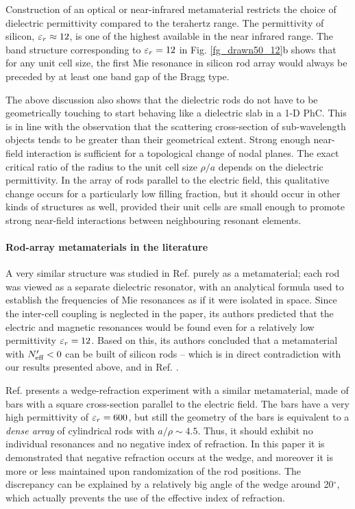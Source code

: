Construction of an optical or near-infrared metamaterial restricts the choice of dielectric permittivity compared to the terahertz range. 
The permittivity of silicon, $\varepsilon_r \approx 12$, is one of the highest available in the near infrared range. The band structure corresponding to $\varepsilon_r=12$ in Fig. \ref{fg_drawn50_12}b shows that for any unit cell size, the first Mie resonance in silicon rod array would always be preceded by at least one band gap of the Bragg type. 

The above discussion also shows that the dielectric rods do not have to be geometrically touching to start behaving like a dielectric slab in a 1-D PhC. This is in line with the observation that the scattering cross-section of sub-wavelength objects tends to be greater than their geometrical extent.
Strong enough near-field interaction is sufficient for a topological change of nodal planes. The exact critical ratio of the radius to the unit cell size $\rho/a$ depends on the dielectric permittivity. In the array of rods parallel to the electric field, this qualitative change occurs for a particularly low filling fraction, but it should occur in other kinds of structures as well, provided their unit cells are small enough to promote strong near-field interactions between neighbouring resonant elements.

\paragraph{Rod-array metamaterials in the literature} %
A very similar structure was studied in Ref. \cite{vynck2009all} purely as a metamaterial; each rod was viewed as a separate dielectric resonator, with an analytical formula used to establish the frequencies of  Mie resonances as if it were isolated in space. Since the inter-cell coupling is neglected in the paper, its authors predicted that the electric and magnetic resonances would be found even for a relatively low permittivity $\varepsilon_r = 12$. Based on this, its authors concluded that a metamaterial with $N_{\text{eff} }'<0$ can be built of silicon rods -- which is in direct contradiction with our results presented above, and in Ref. \cite{dominec2014transition}.

Ref. \cite{peng2007} presents a wedge-refraction experiment with a similar metamaterial, made of bars with a square cross-section parallel to the electric field. The bars have a very high permittivity of $\varepsilon_r=600$, but still the geometry of the bars is equivalent to a \textit{dense array} of cylindrical rods with $a/\rho \sim 4.5$. Thus, it should exhibit no individual resonances and no negative index of refraction. In this paper it is demonstrated  \cite[Fig. 3bc]{peng2007} that negative refraction occurs at the wedge, and moreover it is more or less maintained upon randomization of the rod positions.
The discrepancy can be explained by a relatively big angle of the wedge around 20$^\circ$, which actually prevents the use of the effective index of refraction. %

